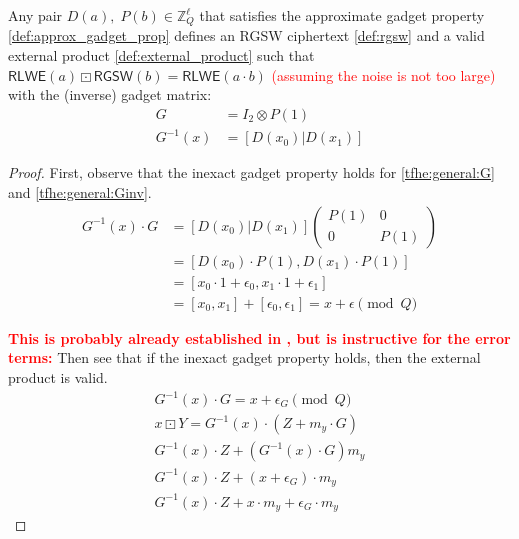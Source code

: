 \begin{theorem}%
    \label{the:gadget} %
    Any pair $D(a),\; P(b) \in \mathbb{Z}_{Q}^{\ell}$ that satisfies the approximate gadget property \eqref{def:approx_gadget_prop} defines an RGSW ciphertext \eqref{def:rgsw} and a valid external product \eqref{def:external_product} such that $\mathsf{RLWE}(a)\boxdot\mathsf{RGSW}(b) = \mathsf{RLWE}(a\cdot b)$ \textcolor{red}{(assuming the noise is not too large)} with the (inverse) gadget matrix:
    \begin{align}
        \label{tfhe:general:G}
        G &= I_2\otimes P(1)\\
        \label{tfhe:general:Ginv}
        G^{-1}(x) &= [D(x_0)|D(x_1)]
    \end{align}
    
    \begin{proof}
        First, observe that the inexact gadget property holds for \eqref{tfhe:general:G} and \eqref{tfhe:general:Ginv}.
        \begin{align*}
            G^{-1}(x)\cdot G &= [D(x_0)|D(x_1)] \begin{pmatrix}
                P(1) & 0 \\
                0 & P(1)
            \end{pmatrix} 
            \\ &= [D(x_0)\cdot P(1), D(x_1)\cdot P(1)] 
            \\ &= [x_0 \cdot 1 + \epsilon_0, x_1 \cdot 1 + \epsilon_1] 
            \\ &= [x_0, x_1] + [\epsilon_0, \epsilon_1] = x + \epsilon \pmod{Q}
        \end{align*}

        \textcolor{red}{\textbf{This is probably already established in \cite{cryptoeprint:2018/421}, but is instructive for the error terms:}} Then see that if the inexact gadget property holds, then the external product is valid.
        \begin{gather*}
            G^{-1}(x)\cdot G = x + \epsilon_G \pmod{Q} \\
            x\boxdot Y = G^{-1}(x)\cdot (Z + m_y\cdot G) \\
            G^{-1}(x)\cdot Z + (G^{-1}(x)\cdot G)m_y \\
            G^{-1}(x)\cdot Z + (x + \epsilon_G)\cdot m_y \\
            G^{-1}(x)\cdot Z + x\cdot m_y + \epsilon_G \cdot m_y
        \end{gather*}


\end{proof}
\end{theorem}
